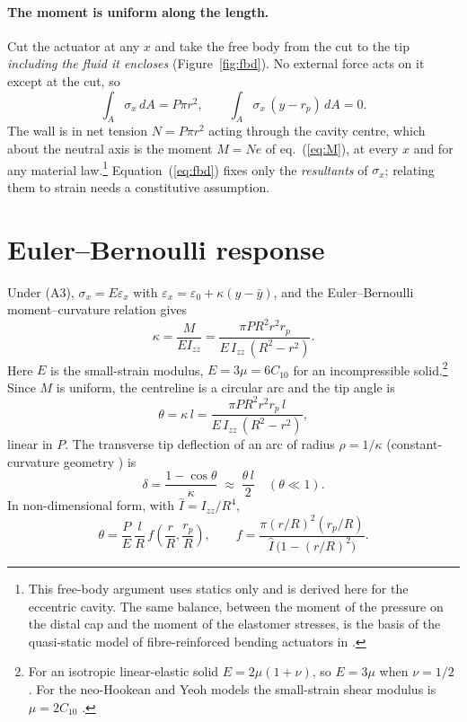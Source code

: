 \documentclass[12pt,a4paper,oneside]{report}
\numberwithin{equation}{chapter}
\numberwithin{figure}{chapter}
\numberwithin{table}{chapter}
\newcommand{\Izz}{I_{zz}}
\newcommand{\rp}{r_p}
\begin{document}
\paragraph{The moment is uniform along the length.} Cut the actuator at any $x$ and take the free body from
the cut to the tip \emph{including the fluid it encloses} (Figure~\ref{fig:fbd}). No external force acts on
it except at the cut, so
\begin{equation}
\int_A \sigma_x\,dA = P\pi r^2 ,\qquad \int_A \sigma_x\,(y-\rp)\,dA = 0 . \label{eq:fbd}
\end{equation}
The wall is in net tension $N=P\pi r^2$ acting through the cavity centre, which about the neutral axis is
the moment $M=Ne$ of eq.~(\ref{eq:M}), at every $x$ and for any material law.\footnote{This free-body
argument uses statics only and is derived here for the eccentric cavity. The same balance, between the
moment of the pressure on the distal cap and the moment of the elastomer stresses, is the basis of the
quasi-static model of fibre-reinforced bending actuators in \cite{polygerinos2015}.} Equation~(\ref{eq:fbd}) fixes
only the \emph{resultants} of $\sigma_x$; relating them to strain needs a constitutive assumption.

\section{Euler--Bernoulli response}\label{sec:beam}
Under (A3), $\sigma_x = E\varepsilon_x$ with $\varepsilon_x=\varepsilon_0+\kappa(y-\bar y)$, and the
Euler--Bernoulli moment--curvature relation \cite{gere2013,timoshenko1970} gives
\begin{equation}
\kappa = \frac{M}{E\Izz} = \frac{\pi P R^2 r^2 \rp}{E\,\Izz\,(R^2-r^2)}. \label{eq:kappa}
\end{equation}
Here $E$ is the small-strain modulus, $E=3\mu=6C_{10}$ for an incompressible
solid.\footnote{For an isotropic linear-elastic solid $E=2\mu(1+\nu)$, so $E=3\mu$ when $\nu=1/2$
\cite{timoshenko1970}. For the neo-Hookean and Yeoh models the small-strain shear modulus is $\mu=2C_{10}$
\cite{treloar1975,holzapfel2000,yeoh1993}.} Since $M$ is uniform,
the centreline is a circular arc and the tip angle is
\begin{equation}
\theta = \kappa\,l = \frac{\pi P R^2 r^2 \rp\, l}{E\,\Izz\,(R^2-r^2)}, \label{eq:theta}
\end{equation}
linear in $P$. The transverse tip deflection of an arc of radius $\rho=1/\kappa$ (constant-curvature
geometry \cite{webster2010}) is
\begin{equation}
\delta = \frac{1-\cos\theta}{\kappa} \;\approx\; \frac{\theta\, l}{2}\quad(\theta\ll1). \label{eq:delta}
\end{equation}
In non-dimensional form, with $\hat I=\Izz/R^4$,
\begin{equation}
\theta = \frac{P}{E}\,\frac{l}{R}\,f\!\left(\frac{r}{R},\frac{\rp}{R}\right),\qquad
f = \frac{\pi (r/R)^2(\rp/R)}{\hat I\,\big(1-(r/R)^2\big)} . \label{eq:nondim}
\end{equation}
\end{document}
